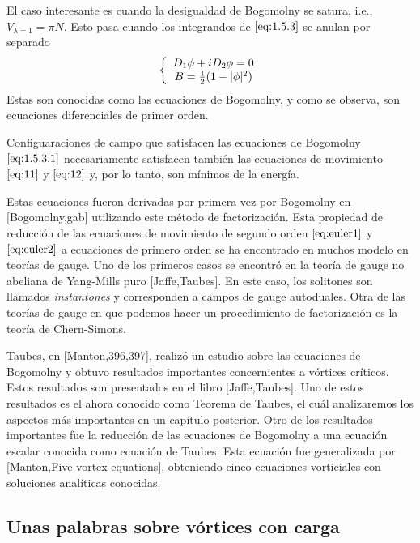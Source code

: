  El caso interesante es cuando la desigualdad de Bogomolny se satura, i.e., $V_{\lambda=1}=\pi N$. Esto pasa cuando los integrandos de $\eqref{eq:1.5.3}$ se anulan por separado
 \begin{align}
     \left\{\begin{array}{c}
          D_1\phi+iD_2\phi = 0  \\
          B = \frac{1}{2}(1-|\phi|^2)
     \end{array}\right. \label{eq:1.5.3.1}
 \end{align}
 Estas son conocidas como las ecuaciones de Bogomolny, y como se observa, son ecuaciones diferenciales de primer orden.
 
 Configuaraciones de campo que satisfacen las ecuaciones de Bogomolny $\eqref{eq:1.5.3.1}$  necesariamente satisfacen también las ecuaciones de movimiento $\eqref{eq:11}$ y $\eqref{eq:12}$ y, por lo tanto, son mínimos de la energía.
 
 Estas ecuaciones fueron derivadas por primera vez por Bogomolny en [Bogomolny,gab] utilizando este método de factorización. Esta propiedad de reducción de las ecuaciones de movimiento de segundo orden $\eqref{eq:euler1}$ y $\eqref{eq:euler2}$ a ecuaciones de primero orden se ha encontrado en muchos modelo en teorías de gauge. Uno de los primeros casos se encontró en la teoría de gauge no abeliana de Yang-Mills puro [Jaffe,Taubes]. En este caso, los solitones son llamados \emph{instantones} y corresponden a campos de gauge autoduales.
 Otra de las teorías de gauge en que podemos hacer un procedimiento de factorización es la teoría de Chern-Simons.
 
 Taubes, en [Manton,396,397], realizó un estudio sobre las ecuaciones de Bogomolny y obtuvo resultados importantes concernientes a vórtices críticos. Estos resultados son presentados en el libro [Jaffe,Taubes]. Uno de estos resultados es el ahora conocido como Teorema de Taubes, el cuál analizaremos los aspectos más importantes en un capítulo posterior. Otro de los resultados importantes fue la reducción de las ecuaciones de Bogomolny a una ecuación escalar conocida como ecuación de Taubes. Esta ecuación fue generalizada por [Manton,Five vortex equations], obteniendo cinco ecuaciones vorticiales con soluciones analíticas conocidas.
 
 \subsection{Unas palabras sobre vórtices con carga}
 
